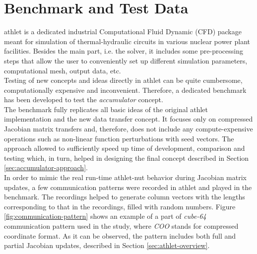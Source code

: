 \section{Benchmark and Test Data}
\label{sec:benchmark-and-test-data}


\acrshort{athlet} is a dedicated industrial Computational Fluid Dynamic (CFD) package meant for simulation of thermal-hydraulic circuits in various nuclear power plant facilities. Besides the main part, i.e. the solver, it includes some pre-processing steps that allow the user to conveniently set up different simulation parameters, computational mesh, output data, etc.\\


Testing of new concepts and ideas directly in \acrshort{athlet} can be quite cumbersome, computationally expensive and inconvenient. Therefore, a dedicated benchmark has been developed to test the \textit{accumulator} concept.\\


The benchmark fully replicates all basic ideas of the original \acrshort{athlet} implementation and the new data transfer concept. It  focuses only on compressed Jacobian matrix transfers and, therefore, does not include any compute-expensive operations such as non-linear function perturbations with seed vectors. The approach allowed to sufficiently speed up time of development, comparison and testing which, in turn, helped in designing the final concept described in Section \ref{sec:accumulator-approach}.\\%


In order to mimic the real run-time \acrshort{athlet}-\acrshort{nut} behavior during Jacobian matrix updates, a few communication patterns were recorded in \acrshort{athlet} and played in the benchmark. The recordings helped to generate column vectors with the lengths corresponding to that in the recordings, filled with random numbers. Figure \ref{fig:communication-pattern} shows an example of a part of  \textit{cube-64} communication pattern used in the study, where \textit{COO} stands for compressed coordinate format. As it can be observed, the pattern includes both full and partial Jacobian updates, described in Section \ref{sec:athlet-overview}.\\


